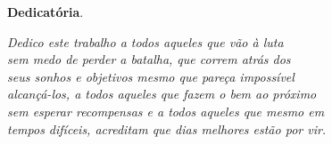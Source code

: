 \begin{dedicatoria}
   \vspace*{\fill}
   \centering
   \noindent
	\textbf{Dedicatória}.

   \textit{
   	 Dedico este trabalho a todos aqueles que vão à luta \\
   	sem medo de perder a batalha, que correm atrás dos  \\
   	seus sonhos e objetivos mesmo que pareça impossível \\
   	alcançá-los, a todos aqueles que fazem o bem ao próximo \\
   	sem esperar recompensas e a todos aqueles que mesmo em \\
   	tempos difíceis, acreditam que dias melhores estão por vir.} \vspace*{\fill}
\end{dedicatoria}
